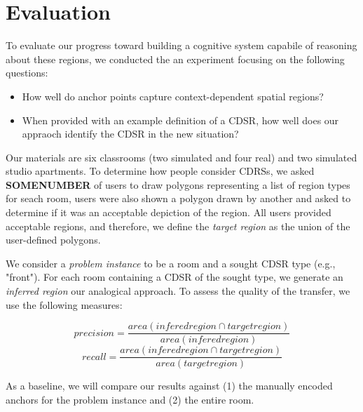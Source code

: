\documentclass[letterpaper]{article}
\begin{document}
 \section{Evaluation}

To evaluate our progress toward building a cognitive system capabile of reasoning about these regions, we conducted the an experiment focusing on the following questions:
\begin{itemize}
\item{How well do anchor points capture context-dependent spatial regions?}
\item{When provided with an example definition of a CDSR, how well does our appraoch identify the CDSR in the new situation?}
\end{itemize}
 Our materials are six classrooms (two simulated and four real) and two simulated studio apartments. To determine how people consider CDRSs, we asked \textbf{SOMENUMBER} of users to draw polygons representing a list of region types for seach room, users were also shown a polygon drawn by another and asked to determine if it was an acceptable depiction of the region. All users provided acceptable regions, and therefore, we define the \textit{target region} as the union of the user-defined polygons.

We consider a \textit{problem instance} to be a room and a sought CDSR type (e.g., "front"). For each room containing a CDSR of the sought type, we generate an \textit{inferred region} our analogical approach. To assess the quality of the transfer, we use the following measures:

\begin{equation}
	precision=\frac{area(infered region \cap target region)}{area(infered region)}
\end{equation}
\begin{equation}
	recall=\frac{area(infered region \cap target region)}{area(target region)}
\end{equation}

As a baseline, we will compare our results against (1) the manually encoded anchors for the problem instance and (2) the entire room.
\end{document}
